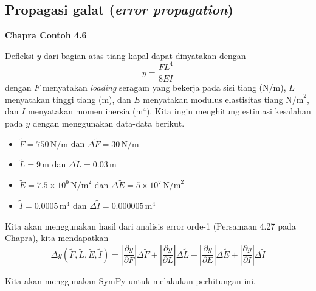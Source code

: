 \subsection{Propagasi galat (\textit{error propagation})}

\textbf{Chapra Contoh 4.6}

Defleksi $y$ dari bagian atas tiang kapal dapat dinyatakan
dengan
\begin{equation}
y = \frac{FL^{4}}{8EI}
\end{equation}
dengan $F$ menyatakan \textit{loading} seragam yang bekerja pada sisi
tiang (N/m), $L$ menyatakan tinggi tiang (m), dan $E$ menyatakan
modulus elastisitas tiang $\textrm{N/m}^{2}$, dan $I$ menyatakan
momen inersia ($\textrm{m}^{4}$). Kita ingin menghitung estimasi kesalahan
pada $y$ dengan menggunakan data-data berikut.
\begin{itemize}
\item $\tilde{F} = 750\,\textrm{N/m}$ dan $\Delta\tilde{F} = 30\,\textrm{N/m}$
\item $\tilde{L} = 9\,\textrm{m}$ dan $\Delta\tilde{L} = 0.03\,\textrm{m}$
\item $\tilde{E} = 7.5\times10^{9}\,\textrm{N/m}^{2}$ dan $\Delta\tilde{E} = 5\times10^{7}\,\textrm{N/m}^{2}$
\item $\tilde{I} = 0.0005\,\textrm{m}^{4}$ dan $\Delta\tilde{I} = 0.000005\,\textrm{m}^{4}$
\end{itemize}

Kita akan menggunakan hasil dari analisis error orde-1 (Persamaan 4.27 pada Chapra), kita
mendapatkan
\begin{equation*}
\Delta y(\tilde{F},\tilde{L},\tilde{E},\tilde{I}) =
\left| \frac{\partial y}{\partial F} \right| \Delta\tilde{F} +
\left| \frac{\partial y}{\partial L} \right| \Delta\tilde{L} +
\left| \frac{\partial y}{\partial E} \right| \Delta\tilde{E} +
\left| \frac{\partial y}{\partial I} \right| \Delta\tilde{I}
\end{equation*}

Kita akan menggunakan SymPy untuk melakukan perhitungan ini.


